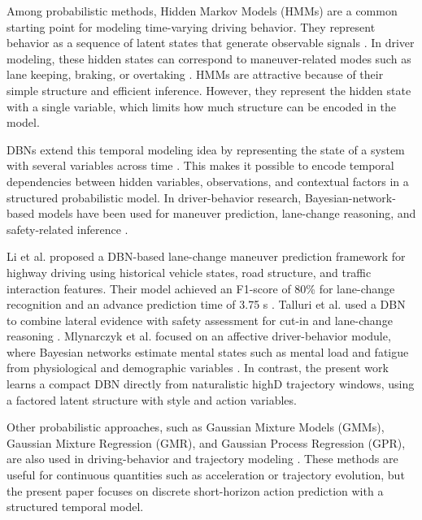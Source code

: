 \documentclass[upint,subscriptcorrection,varvw,hyphenate,balance,greek,russian,vietnamese,german]{asmeconf} %
\begin{document}
Among probabilistic methods, Hidden Markov Models (HMMs) are a common starting point for modeling time-varying driving behavior. 
They represent behavior as a sequence of latent states that generate observable signals \cite{rabiner1989tutorial}. 
In driver modeling, these hidden states can correspond to maneuver-related modes such as lane keeping, braking, or overtaking \cite{8500717}. 
HMMs are attractive because of their simple structure and efficient inference. 
However, they represent the hidden state with a single variable, which limits how much structure can be encoded in the model.

DBNs extend this temporal modeling idea by representing the state of a system with several variables across time \cite{murphy2002dynamic,pearl1995bayesian}. 
This makes it possible to encode temporal dependencies between hidden variables, observations, and contextual factors in a structured probabilistic model. 
In driver-behavior research, Bayesian-network-based models have been used for maneuver prediction, lane-change reasoning, and safety-related inference 
 \cite{electronics8010040,2025bayesiannetworkapproachbuilding,talluri2025enhancingsafetystandardsautomated}. 

Li et al. proposed a DBN-based lane-change maneuver prediction framework for highway driving using historical vehicle states, road structure, and traffic interaction features. 
Their model achieved an F1-score of 80\% for lane-change recognition and an advance prediction time of 3.75 s \cite{electronics8010040}. 
Talluri et al. used a 
DBN to combine lateral evidence with safety assessment for cut-in and lane-change reasoning \cite{talluri2025enhancingsafetystandardsautomated}. 
Mlynarczyk et al. focused on an affective driver-behavior module, where Bayesian networks estimate mental states such as mental load and fatigue from physiological 
and demographic variables \cite{2025bayesiannetworkapproachbuilding}. 
In contrast, the present work learns a compact DBN directly from naturalistic highD trajectory windows, using a factored latent structure with style and action variables. 

Other probabilistic approaches, such as Gaussian Mixture Models (GMMs), Gaussian Mixture Regression (GMR), and Gaussian Process Regression (GPR), are also used in driving-behavior and trajectory modeling 
\cite{mozaffari2023multimodalmanoeuvretrajectoryprediction,zhang2024learningcarfollowingbehaviorsusing,Bethge2023ModelPC}. 
These methods are useful for continuous quantities such as acceleration or trajectory evolution, but the present paper focuses on discrete short-horizon action prediction with a structured temporal model.
\end{document}

